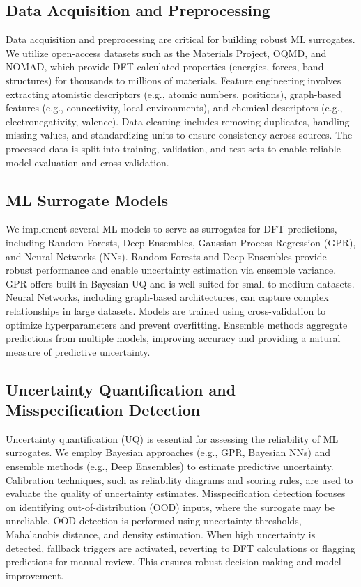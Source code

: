 \documentclass[12pt]{article}
\begin{document}
\subsection{Data Acquisition and Preprocessing}
Data acquisition and preprocessing are critical for building robust ML surrogates. We utilize open-access datasets such as the Materials Project, OQMD, and NOMAD, which provide DFT-calculated properties (energies, forces, band structures) for thousands to millions of materials. Feature engineering involves extracting atomistic descriptors (e.g., atomic numbers, positions), graph-based features (e.g., connectivity, local environments), and chemical descriptors (e.g., electronegativity, valence). Data cleaning includes removing duplicates, handling missing values, and standardizing units to ensure consistency across sources. The processed data is split into training, validation, and test sets to enable reliable model evaluation and cross-validation.

\subsection{ML Surrogate Models}
We implement several ML models to serve as surrogates for DFT predictions, including Random Forests, Deep Ensembles, Gaussian Process Regression (GPR), and Neural Networks (NNs). Random Forests and Deep Ensembles provide robust performance and enable uncertainty estimation via ensemble variance. GPR offers built-in Bayesian UQ and is well-suited for small to medium datasets. Neural Networks, including graph-based architectures, can capture complex relationships in large datasets. Models are trained using cross-validation to optimize hyperparameters and prevent overfitting. Ensemble methods aggregate predictions from multiple models, improving accuracy and providing a natural measure of predictive uncertainty.

\subsection{Uncertainty Quantification and Misspecification Detection}
Uncertainty quantification (UQ) is essential for assessing the reliability of ML surrogates. We employ Bayesian approaches (e.g., GPR, Bayesian NNs) and ensemble methods (e.g., Deep Ensembles) to estimate predictive uncertainty. Calibration techniques, such as reliability diagrams and scoring rules, are used to evaluate the quality of uncertainty estimates. Misspecification detection focuses on identifying out-of-distribution (OOD) inputs, where the surrogate may be unreliable. OOD detection is performed using uncertainty thresholds, Mahalanobis distance, and density estimation. When high uncertainty is detected, fallback triggers are activated, reverting to DFT calculations or flagging predictions for manual review. This ensures robust decision-making and model improvement.
\end{document}
